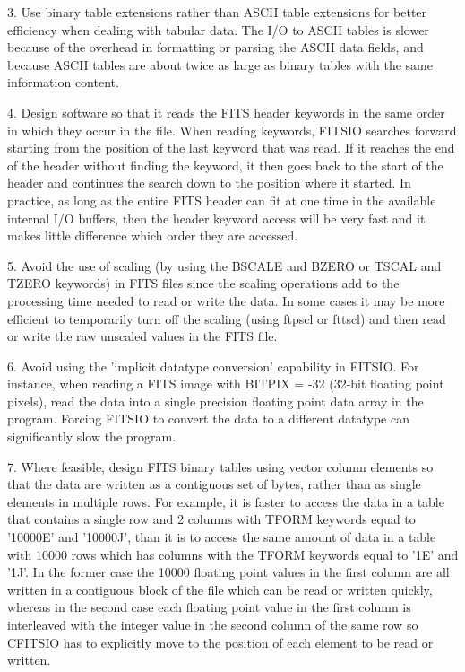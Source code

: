 \documentclass[11pt]{book}
\begin{document}
3.  Use binary table extensions rather than ASCII table
extensions for better efficiency  when dealing with tabular data.  The
I/O to ASCII tables is slower because of the overhead in formatting or
parsing the ASCII data fields, and because ASCII tables are about twice
as large as binary tables with the same information content.

4. Design software so that it reads the FITS header keywords in the
same order in which they occur in the file.  When reading keywords,
FITSIO searches forward starting from the position of the last keyword
that was read.  If it reaches the end of the header without finding the
keyword, it then goes back to the start of the header and continues the
search down to the position where it started.  In practice, as long as
the entire FITS header can fit at one time in the available internal I/O
buffers, then the header keyword access will be very fast and it makes
little difference which order they are accessed.

5. Avoid the use of scaling (by using the BSCALE and BZERO or TSCAL and
TZERO keywords) in FITS files since the scaling operations add to the
processing time needed to read or write the data.  In some cases it may
be more efficient to temporarily turn off the scaling (using ftpscl or
fttscl) and then read or write the raw unscaled values in the FITS
file.

6. Avoid using the 'implicit datatype conversion' capability in
FITSIO.  For instance, when reading a FITS image with BITPIX = -32
(32-bit floating point pixels), read the data into a single precision
floating point data array in the program.  Forcing FITSIO to convert
the data to a different datatype can significantly slow the program.

7. Where feasible, design FITS binary tables using vector column
elements so that the data are written as a contiguous set of bytes,
rather than as single elements in multiple rows.  For example, it is
faster to access the data in a table that contains a single row
and 2 columns with TFORM keywords equal to  '10000E' and '10000J', than
it is to access the same amount of data in a table with 10000 rows
which has columns with the TFORM keywords equal to '1E' and '1J'.  In
the former case the 10000 floating point values in the first column are
all written in a contiguous block of the file which can be read or
written quickly, whereas in the second case each floating point value
in the first column is interleaved with the integer value in the second
column of the same row so CFITSIO has to explicitly move to the
position of each element to be read or written.
\end{document}
